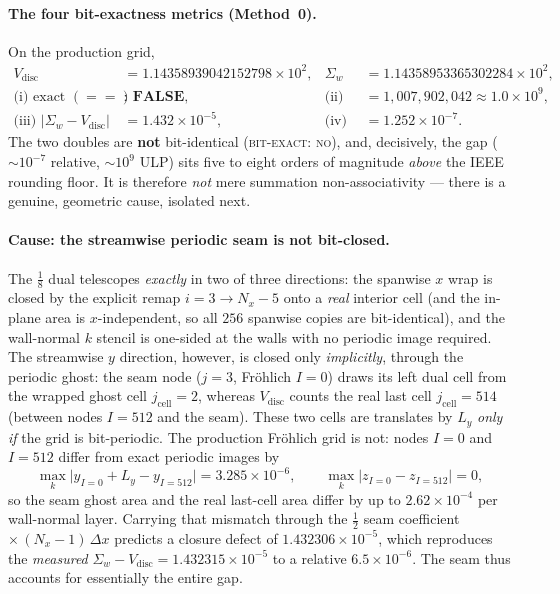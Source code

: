 \documentclass[11pt]{article}
\theoremstyle{definition}
\theoremstyle{remark}
\begin{document}
\paragraph{The four bit-exactness metrics (Method~0).}
On the production grid,
\begin{equation}
\begin{aligned}
V_{\mathrm{disc}} &= 1.14358939042152798\times 10^{2}, &
\Sigma_w &= 1.14358953365302284\times 10^{2},\\[2pt]
\text{(i) exact }(==) &: \ \textbf{FALSE}, &
\text{(ii) ULP gap} &= 1{,}007{,}902{,}042 \approx 1.0\times10^{9},\\[2pt]
\text{(iii) }|\Sigma_w-V_{\mathrm{disc}}| &= 1.432\times10^{-5}, &
\text{(iv) rel} &= 1.252\times10^{-7}.
\end{aligned}
\label{eq:E4-metrics}
\end{equation}
The two doubles are \textbf{not} bit-identical (\textsc{bit-exact: no}), and,
decisively, the gap ($\sim\!10^{-7}$ relative, $\sim\!10^{9}$ ULP) sits five to
eight orders of magnitude \emph{above} the IEEE rounding floor. It is therefore
\emph{not} mere summation non-associativity --- there is a genuine, geometric
cause, isolated next.

\paragraph{Cause: the streamwise periodic seam is not bit-closed.}
The $\tfrac18$ dual telescopes \emph{exactly} in two of three directions: the
spanwise $x$ wrap is closed by the explicit remap $i{=}3\!\to\!N_x{-}5$ onto a
\emph{real} interior cell (and the in-plane area is $x$-independent, so all $256$
spanwise copies are bit-identical), and the wall-normal $k$ stencil is one-sided
at the walls with no periodic image required. The streamwise $y$ direction,
however, is closed only \emph{implicitly}, through the periodic ghost: the seam
node ($j{=}3$, Fr\"ohlich $I{=}0$) draws its left dual cell from the wrapped ghost
cell $j_{\mathrm{cell}}{=}2$, whereas $V_{\mathrm{disc}}$ counts the real last
cell $j_{\mathrm{cell}}{=}514$ (between nodes $I{=}512$ and the seam). These two
cells are translates by $L_y$ \emph{only if} the grid is bit-periodic. The
production Fr\"ohlich grid is not: nodes $I{=}0$ and $I{=}512$ differ from exact
periodic images by
\[
\max_k\bigl|y_{I=0}{+}L_y-y_{I=512}\bigr| = 3.285\times10^{-6},
\qquad \max_k|z_{I=0}-z_{I=512}| = 0 ,
\]
so the seam ghost area and the real last-cell area differ by up to
$2.62\times10^{-4}$ per wall-normal layer. Carrying that mismatch through the
$\tfrac12$ seam coefficient $\times\,(N_x{-}1)\,\Delta x$ predicts a closure
defect of $1.432306\times10^{-5}$, which reproduces the \emph{measured}
$\Sigma_w-V_{\mathrm{disc}}=1.432315\times10^{-5}$ to a relative
$6.5\times10^{-6}$. The seam thus accounts for essentially the entire gap.
\end{document}
